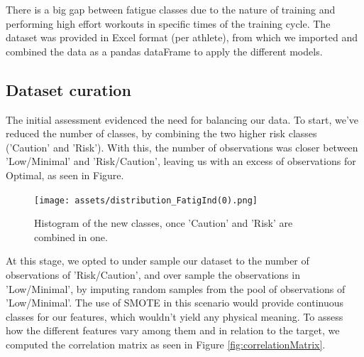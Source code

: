 \documentclass[conference]{IEEEtran}
\begin{document}
There is a big gap between fatigue classes due to the nature of training and performing high effort workouts in specific times of the training cycle. The dataset was provided in Excel format (per athlete), from which we imported and combined the data as a pandas dataFrame to apply the different models.



\subsection{Dataset curation}

The initial assessment evidenced the need for balancing our data. To start, we've reduced the number of classes, by combining the two higher risk classes ('Caution' and 'Risk'). With this, the number of observations was closer between 'Low/Minimal' and 'Risk/Caution', leaving us with an excess of observations for Optimal, as seen in Figure. 

\begin{figure}[H]
    \centering
    \texttt{[image: assets/distribution\_FatigInd(0).png]}
    \caption{Histogram of the new classes, once 'Caution' and 'Risk' are combined in one.}
    \label{histClasses}
\end{figure}

At this stage, we opted to under sample our dataset to the number of observations of 'Risk/Caution', and over sample the observations in 'Low/Minimal', by imputing random samples from the pool of observations of 'Low/Minimal'. The use of SMOTE in this scenario would provide continuous classes for our features, which wouldn't yield any physical meaning.
To assess how the different features vary among them and in relation to the target, we computed the correlation matrix as seen in Figure \ref{fig:correlationMatrix}.
\end{document}
